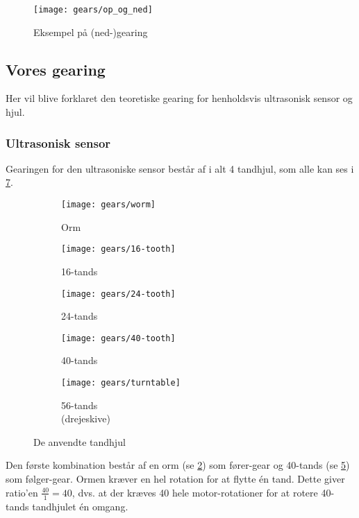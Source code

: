 \begin{figure}[h]
\centering
\texttt{[image: gears/op\_og\_ned]}
\caption{Eksempel på (ned-)gearing}
\label{gearing:nedgearing}
\end{figure}

\subsection{Vores gearing}
Her vil blive forklaret den teoretiske gearing for henholdsvis ultrasonisk sensor og hjul.

\subsubsection{Ultrasonisk sensor}
Gearingen for den ultrasoniske sensor består af i alt 4 tandhjul, som alle kan ses i \cref{gearing:tandhjul}.

\begin{figure}[h] %
\centering
\begin{subfigure}[b]{.19\textwidth}
\centering
\texttt{[image: gears/worm]}
\caption{Orm}
\label{gearing:orm}
\end{subfigure}
\begin{subfigure}[b]{.19\textwidth}
\centering
\texttt{[image: gears/16-tooth]}
\caption{16-tands}
\label{gearing:16tand}
\end{subfigure}
\begin{subfigure}[b]{.19\textwidth}
\centering
\texttt{[image: gears/24-tooth]}
\caption{24-tands}
\label{gearing:24tand}
\end{subfigure}
\begin{subfigure}[b]{.19\textwidth}
\centering
\texttt{[image: gears/40-tooth]}
\caption{40-tands}
\label{gearing:40tand}
\end{subfigure}
\begin{subfigure}[b]{.19\textwidth}
\centering
\texttt{[image: gears/turntable]}
\caption{56-tands \\ \centering (drejeskive)}
\label{gearing:56tand}
\end{subfigure}
\caption{De anvendte tandhjul}
\label{gearing:tandhjul}
\end{figure}

Den første kombination består af en orm (se \cref{gearing:orm}) som fører-gear og 40-tands (se \cref{gearing:40tand}) som følger-gear.
Ormen kræver en hel rotation for at flytte én tand.
Dette giver ratio'en $\frac{40}{1} = 40$, dvs. at der kræves 40 hele motor-rotationer for at rotere 40-tands tandhjulet én omgang.

